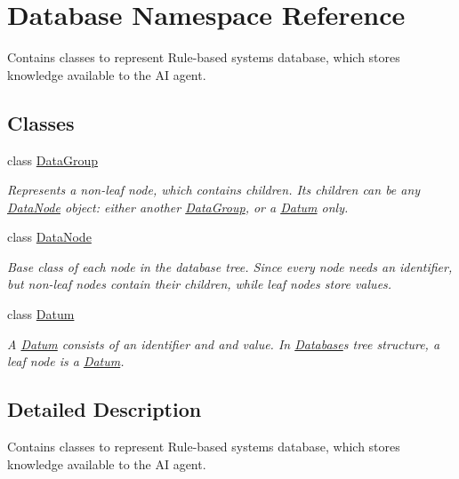 \hypertarget{namespaceDatabase}{}\section{Database Namespace Reference}
\label{namespaceDatabase}


Contains classes to represent Rule-\/based system\textquotesingle{}s database, which stores knowledge available to the AI agent.  


\subsection*{Classes}
\begin{DoxyCompactItemize}
\item 
class \hyperlink{classDatabase_1_1DataGroup}{Data\+Group}
\begin{DoxyCompactList}\small\item\em Represents a non-\/leaf node, which contains children. Its children can be any \hyperlink{classDatabase_1_1DataNode}{Data\+Node} object\+: either another \hyperlink{classDatabase_1_1DataGroup}{Data\+Group}, or a \hyperlink{classDatabase_1_1Datum}{Datum} only. \end{DoxyCompactList}\item 
class \hyperlink{classDatabase_1_1DataNode}{Data\+Node}
\begin{DoxyCompactList}\small\item\em Base class of each node in the database tree. Since every node needs an identifier, but non-\/leaf nodes contain their children, while leaf nodes store values. \end{DoxyCompactList}\item 
class \hyperlink{classDatabase_1_1Datum}{Datum}
\begin{DoxyCompactList}\small\item\em A \hyperlink{classDatabase_1_1Datum}{Datum} consists of an identifier and and value. In \hyperlink{namespaceDatabase}{Database}\textquotesingle{}s tree structure, a leaf node is a \hyperlink{classDatabase_1_1Datum}{Datum}. \end{DoxyCompactList}\end{DoxyCompactItemize}


\subsection{Detailed Description}
Contains classes to represent Rule-\/based system\textquotesingle{}s database, which stores knowledge available to the AI agent. 